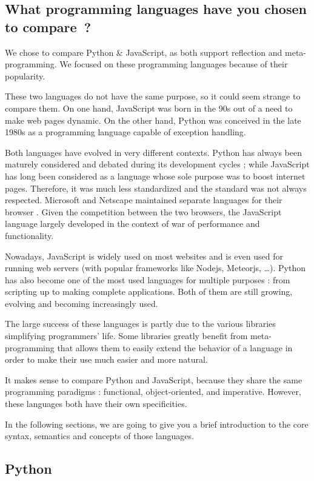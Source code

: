 \documentclass[a4paper,10pt]{article}
\begin{document}
\subsection{What programming languages have you chosen to \mbox{compare ?}}

We chose to compare Python \& JavaScript, as both support reflection and meta-programming.
We focused on these programming languages because of their popularity.

These two languages do not have the same purpose, so it could seem strange to compare them.
On one hand, JavaScript was born in the 90s out of a need to make web pages dynamic.
On the other hand, Python was conceived in the late 1980s as a programming language capable of exception handling.

Both languages have evolved in very different contexts.
Python has always been maturely considered and debated during its development cycles \cite{ wiki:python}; while JavaScript has long been considered as a language whose sole purpose was to boost internet pages.
Therefore, it was much less standardized and the standard was not always respected.
Microsoft and Netscape maintained separate languages for their browser \cite{wiki:javascript}.
Given the competition between the two browsers, the JavaScript language largely developed in the context of war of performance and functionality.

Nowadays, JavaScript is widely used on most websites and is even used for running web servers (with popular frameworks like Nodejs, Meteorjs, \dots).
Python has also become one of the most used languages for multiple purposes : from scripting up to making complete applications.
Both of them are still growing, evolving and becoming increasingly used.

The large success of these languages is partly due to the various libraries simplifying  programmers' life.
Some libraries greatly benefit from meta-programming that allows them to easily extend the behavior of a language in order to make their use much easier and more natural.

It makes sense to compare Python and JavaScript, because they share the same programming paradigms : functional, object-oriented, and imperative.
However, these languages both have their own specificities.

In the following sections, we are going to give you a brief introduction to the core syntax, semantics and concepts of those languages.

\subsection{Python}
\setpy
\end{document}
